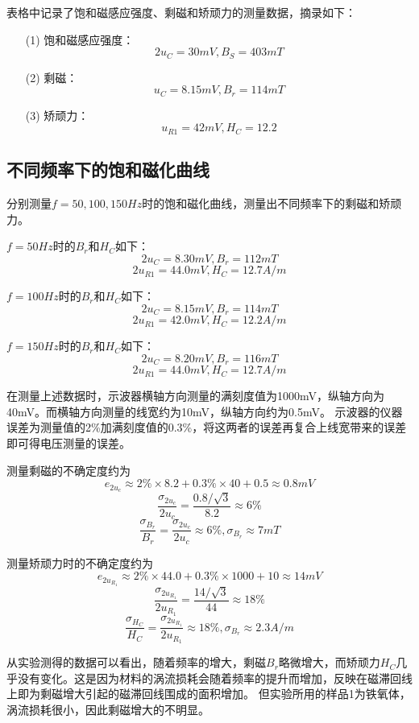 \documentclass{article}
\begin{document}
    表格中记录了饱和磁感应强度、剩磁和矫顽力的测量数据，摘录如下：
    
    \begin{enumerate}
        \item [(1)] 饱和磁感应强度：\\
        $$2u_{C}=30mV,B_{S}=403mT$$

        \item [(2)] 剩磁：\\
        $$u_{C}=8.15mV,B_{r}=114mT$$

        \item [(3)] 矫顽力：\\
        $$u_{R1}=42mV,H_{C}=12.2$$
    \end{enumerate}

    \subsection{不同频率下的饱和磁化曲线}
    分别测量$f=50,100,150Hz$时的饱和磁化曲线，测量出不同频率下的剩磁和矫顽力。

    $f=50Hz$时的$B_r$和$H_C$如下：
    $$2u_{C}=8.30mV,B_{r}=112mT$$
    $$2u_{R1}=44.0mV,H_{C}=12.7A/m$$

    $f=100Hz$时的$B_r$和$H_C$如下：
    $$2u_{C}=8.15mV,B_{r}=114mT$$
    $$2u_{R1}=42.0mV,H_{C}=12.2A/m$$

    $f=150Hz$时的$B_r$和$H_C$如下：
    $$2u_{C}=8.20mV,B_{r}=116mT$$
    $$2u_{R1}=44.0mV,H_{C}=12.7A/m$$

    在测量上述数据时，示波器横轴方向测量的满刻度值为1000mV，纵轴方向为40mV。而横轴方向测量的线宽约为10mV，纵轴方向约为0.5mV。
    示波器的仪器误差为测量值的2\%加满刻度值的0.3\%，将这两者的误差再复合上线宽带来的误差即可得电压测量的误差。
    
    测量剩磁的不确定度约为
    $$e_{2u_c}\approx2\%\times 8.2+0.3\% \times 40+0.5\approx 0.8mV$$
    $$\frac{\sigma_{2u_c}}{2u_c}=\frac{0.8/\sqrt{3}}{8.2}\approx6\%$$
    $$\frac{\sigma_{B_r}}{B_r}=\frac{\sigma_{2u_c}}{2u_c}\approx 6\%,\sigma_{B_r}\approx 7mT$$

    测量矫顽力时的不确定度约为
    $$e_{2u_{R_1}}\approx2\%\times 44.0+0.3\% \times 1000+10\approx 14mV$$
    $$\frac{\sigma_{2u_{R_1}}}{2u_{R_1}}=\frac{14/\sqrt{3}}{44}\approx18\%$$
    $$\frac{\sigma_{H_C}}{H_C}=\frac{\sigma_{2u_{R_1}}}{2u_{R_1}}\approx 18\%,\sigma_{B_r}\approx 2.3A/m$$

    从实验测得的数据可以看出，随着频率的增大，剩磁$B_r$略微增大，而矫顽力$H_C$几乎没有变化。这是因为材料的涡流损耗会随着频率的提升而增加，反映在磁滞回线上即为剩磁增大引起的磁滞回线围成的面积增加。
    但实验所用的样品1为铁氧体，涡流损耗很小，因此剩磁增大的不明显。
\end{document}

